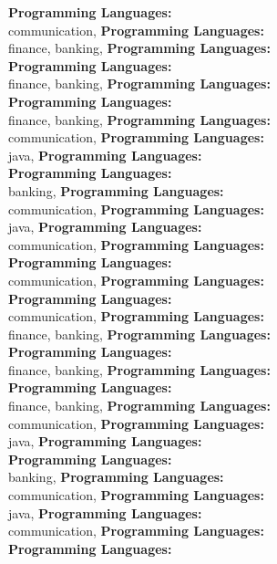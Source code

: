 \textbf{Programming Languages:} \\
communication, \textbf{Programming Languages:} \\
finance, banking, \textbf{Programming Languages:} \\
\textbf{Programming Languages:} \\
finance, banking, \textbf{Programming Languages:} \\
\textbf{Programming Languages:} \\
finance, banking, \textbf{Programming Languages:} \\
communication, \textbf{Programming Languages:} \\
java, \textbf{Programming Languages:} \\
\textbf{Programming Languages:} \\
banking, \textbf{Programming Languages:} \\
communication, \textbf{Programming Languages:} \\
java, \textbf{Programming Languages:} \\
communication, \textbf{Programming Languages:} \\
\textbf{Programming Languages:} \\
communication, \textbf{Programming Languages:} \\
\textbf{Programming Languages:} \\
communication, \textbf{Programming Languages:} \\
finance, banking, \textbf{Programming Languages:} \\
\textbf{Programming Languages:} \\
finance, banking, \textbf{Programming Languages:} \\
\textbf{Programming Languages:} \\
finance, banking, \textbf{Programming Languages:} \\
communication, \textbf{Programming Languages:} \\
java, \textbf{Programming Languages:} \\
\textbf{Programming Languages:} \\
banking, \textbf{Programming Languages:} \\
communication, \textbf{Programming Languages:} \\
java, \textbf{Programming Languages:} \\
communication, \textbf{Programming Languages:} \\
\textbf{Programming Languages:} \\
